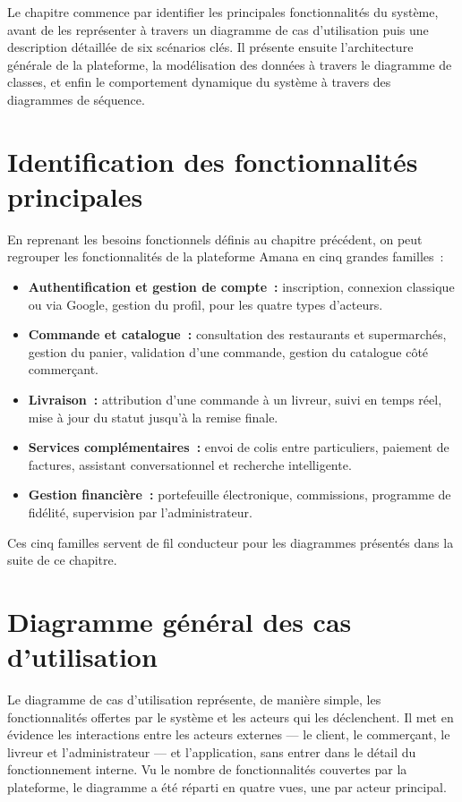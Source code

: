 \documentclass[12pt,fleqn,a4paper]{report}
\begin{document}
\begin{justify}
Le chapitre commence par identifier les principales fonctionnalités du système, avant de les représenter à travers un diagramme de cas d'utilisation puis une description détaillée de six scénarios clés. Il présente ensuite l'architecture générale de la plateforme, la modélisation des données à travers le diagramme de classes, et enfin le comportement dynamique du système à travers des diagrammes de séquence.

\section{Identification des fonctionnalités principales}

En reprenant les besoins fonctionnels définis au chapitre précédent, on peut regrouper les fonctionnalités de la plateforme Amana en cinq grandes familles~:

\begin{itemize}
    \item \textbf{Authentification et gestion de compte~:} inscription, connexion classique ou via Google, gestion du profil, pour les quatre types d'acteurs.
    \item \textbf{Commande et catalogue~:} consultation des restaurants et supermarchés, gestion du panier, validation d'une commande, gestion du catalogue côté commerçant.
    \item \textbf{Livraison~:} attribution d'une commande à un livreur, suivi en temps réel, mise à jour du statut jusqu'à la remise finale.
    \item \textbf{Services complémentaires~:} envoi de colis entre particuliers, paiement de factures, assistant conversationnel et recherche intelligente.
    \item \textbf{Gestion financière~:} portefeuille électronique, commissions, programme de fidélité, supervision par l'administrateur.
\end{itemize}

Ces cinq familles servent de fil conducteur pour les diagrammes présentés dans la suite de ce chapitre.

\section{Diagramme général des cas d'utilisation}

Le diagramme de cas d'utilisation représente, de manière simple, les fonctionnalités offertes par le système et les acteurs qui les déclenchent. Il met en évidence les interactions entre les acteurs externes — le client, le commerçant, le livreur et l'administrateur — et l'application, sans entrer dans le détail du fonctionnement interne. Vu le nombre de fonctionnalités couvertes par la plateforme, le diagramme a été réparti en quatre vues, une par acteur principal.


\end{justify}
\end{document}
